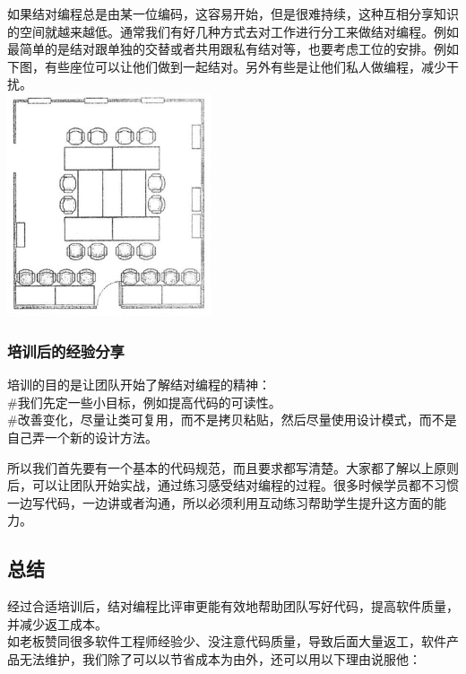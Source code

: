如果结对编程总是由某一位编码，这容易开始，但是很难持续，这种互相分享知识的空间就越来越低。通常我们有好几种方式去对工作进行分工来做结对编程。例如最简单的是结对跟单独的交替或者共用跟私有结对等，也要考虑工位的安排。例如下图，有些座位可以让他们做到一起结对。另外有些是让他们私人做编程，减少干扰。\\

\includegraphics[width=6cm]{Acp3-131.png}

\hypertarget{ux57f9ux8badux540eux7684ux7ecfux9a8cux5206ux4eab}{%
\subsubsection{培训后的经验分享}\label{ux57f9ux8badux540eux7684ux7ecfux9a8cux5206ux4eab}}

培训的目的是让团队开始了解结对编程的精神：\\
\#我们先定一些小目标，例如提高代码的可读性。\\
\#改善变化，尽量让类可复用，而不是拷贝粘贴，然后尽量使用设计模式，而不是自己弄一个新的设计方法。

所以我们首先要有一个基本的代码规范，而且要求都写清楚。大家都了解以上原则后，可以让团队开始实战，通过练习感受结对编程的过程。很多时候学员都不习惯一边写代码，一边讲或者沟通，所以必须利用互动练习帮助学生提升这方面的能力。

\hypertarget{ux603bux7ed3}{%
\subsection{总结}\label{ux603bux7ed3}}

经过合适培训后，结对编程比评审更能有效地帮助团队写好代码，提高软件质量，并减少返工成本。\\
如老板赞同很多软件工程师经验少、没注意代码质量，导致后面大量返工，软件产品无法维护，我们除了可以以节省成本为由外，还可以用以下理由说服他：

